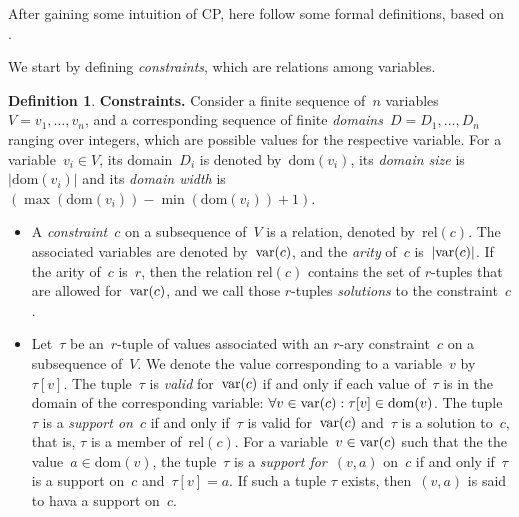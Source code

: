 \documentclass[a4paper,11pt]{article}
\theoremstyle{definition}
\newtheorem{definition}{Definition}
\newcommand{\Dom}[1]{\text{dom}({#1})}
\newcommand{\Relation}[1]{\text{rel}({#1})}
\numberwithin{equation}{section}
\begin{document}
\smallskip

After gaining some intuition of CP, here follow some formal definitions, based on
\cite{Apt:constraintsBook,SchulteCarlsson:FDsys,Gecode:MPG}.%

We start by defining \emph{constraints}, which are relations
among variables.

\begin{definition}
  \label{def:constraint}
  \textbf{Constraints.}
  Consider a finite sequence of~$n$
  variables~$V = v_1,\ldots,v_n$, and a corresponding sequence of
  finite \emph{domains}~$D = D_1,\ldots,D_n$ ranging over integers,
  which are possible values for the respective variable.
  For a variable~$v_i \in V$, its domain~$D_i$ is denoted
  by~$\Dom{v_i}$, its \emph{domain size} is~$|\Dom{v_i}|$ and its \emph{domain width}
  is $(\max(\Dom{v_i}) - \min(\Dom{v_i}) + 1)$.
  \begin{itemize}
  \item   A \emph{constraint}~$c$ on a subsequence of~$V$
    is a relation,
    denoted by~$\Relation{c}$. The associated variables are
    denoted by~$\text{var}(c)$,
    and the \emph{arity} of~$c$ is~$\left\lvert\text{var}(c)\right\rvert$.
    If the arity of~$c$ is~$r$, then the relation
    $\Relation{c}$ contains the set of $r$-tuples that are allowed
    for~$\text{var}(c)$, and we call those $r$-tuples
    \emph{solutions} to the constraint~$c$.

    \item Let~$\tau$ be an~$r$-tuple of values associated with an
      $r$-ary constraint~$c$ on a subsequence of~$V$.
      We denote the value corresponding
      to a variable~$v$ by~$\tau[v]$. The tuple~$\tau$ is \emph{valid}
      for~$\text{var}(c)$
      if and only if each value of~$\tau$ is in the domain of the corresponding
      variable: $\forall v \in \Variables{c}: \tau[v] \in \Dom{v}$.
      The tuple~$\tau$ is a \emph{support on}~$c$ if and only if~$\tau$
      is valid for~$\text{var}(c)$ and~$\tau$ is a solution to~$c$, that is,
      $\tau$ is a member of~$\Relation{c}$.
      For a variable~$v \in \text{var}(c)$ such that the the value~$a \in \Dom{v}$,
      the tuple~$\tau$ is a \emph{support for}~$(v,a)$ on~$c$
      if and only if~$\tau$ is a support on~$c$ and~$\tau[v] = a$. If such a tuple
      $\tau$ exists, then~$(v,a)$ is said to hava a support on~$c$.
    \end{itemize}
\end{definition}
\end{document}
